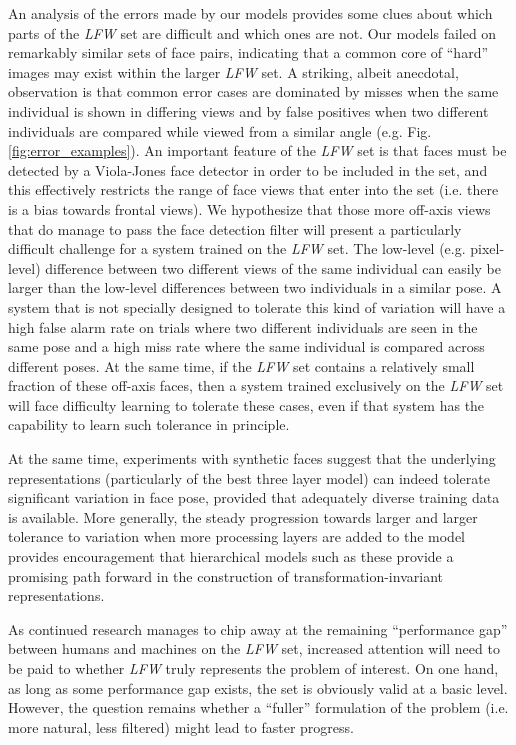 An analysis of the errors made by our models provides some clues about which
parts of the \emph{LFW} set are difficult and which ones are not.  Our models
failed on remarkably similar sets of face pairs, indicating that a common core
of ``hard'' images may exist within the larger \emph{LFW} set.  A striking,
albeit anecdotal, observation is that common error cases are dominated by misses
when the same individual is shown in differing views and by false positives
when two different individuals are compared while viewed from a similar angle
(e.g. Fig. \ref{fig:error_examples}).  An important feature of the \emph{LFW}
set is that faces must be detected by a Viola-Jones face detector in order to be
included in the set, and this effectively restricts the range of face views that
enter into the set (i.e. there is a bias towards frontal views).  We hypothesize
that those more off-axis views that do manage to pass the face detection filter
will present a particularly difficult challenge for a system trained on
the \emph{LFW} set.  The low-level (e.g. pixel-level) difference between two
different views of the same individual can easily be larger than the low-level
differences between two individuals in a similar pose.  A system that is not
specially designed to tolerate this kind of variation will have a high false
alarm rate on trials where two different individuals are seen in the same pose
and a high miss rate where the same individual is compared across different
poses.  At the same time, if the \emph{LFW} set contains a relatively small
fraction of these off-axis faces, then a system trained exclusively on
the \emph{LFW} set will face difficulty learning to tolerate these cases, even
if that system has the capability to learn such tolerance in principle.

At the same time, experiments with synthetic faces suggest that the underlying 
representations (particularly of the best three layer model) can indeed tolerate
significant variation in face pose, provided that adequately diverse training data
is available.  More generally, the steady progression towards larger 
and larger tolerance to variation when more processing layers are added to the 
model provides encouragement that hierarchical models such as these provide 
a promising path forward in the construction of transformation-invariant 
representations.

As continued research manages to chip away at the remaining ``performance gap''
between humans and machines on the \emph{LFW} set, increased attention will need
to be paid to whether \emph{LFW} truly represents the problem of interest.  On
one hand, as long as some performance gap exists, the set is obviously valid at
a basic level.  However, the question remains whether a ``fuller'' formulation
of the problem (i.e. more natural, less filtered) might lead to faster progress.

